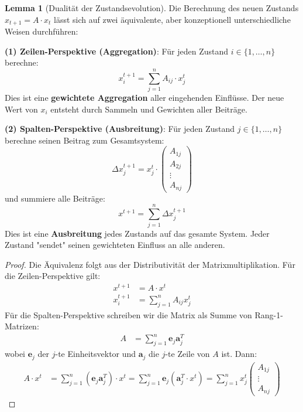﻿\documentclass[a4paper,12pt]{report}
\theoremstyle{definition}
\newtheorem{lemma}{Lemma}
\begin{document}
	\begin{lemma}[Dualität der Zustandsevolution]
		Die Berechnung des neuen Zustands $x_{t+1} = A \cdot x_t$ lässt sich auf zwei äquivalente, aber konzeptionell unterschiedliche Weisen durchführen:
		
		\textbf{(1) Zeilen-Perspektive (Aggregation)}:
		Für jeden Zustand $i \in \{1,\ldots,n\}$ berechne:
		\[
		x_i^{t+1} = \sum_{j=1}^{n} A_{ij} \cdot x_j^t
		\]
		Dies ist eine \textbf{gewichtete Aggregation} aller eingehenden Einflüsse. Der neue Wert von $x_i$ entsteht durch Sammeln und Gewichten aller Beiträge.
		
		\textbf{(2) Spalten-Perspektive (Ausbreitung)}:
		Für jeden Zustand $j \in \{1,\ldots,n\}$ berechne seinen Beitrag zum Gesamtsystem:
		\[
		\Delta x^{t+1}_j = x_j^t \cdot \begin{pmatrix} A_{1j} \\ A_{2j} \\ \vdots \\ A_{nj} \end{pmatrix}
		\]
		und summiere alle Beiträge:
		\[
		x^{t+1} = \sum_{j=1}^{n} \Delta x^{t+1}_j
		\]
		Dies ist eine \textbf{Ausbreitung} jedes Zustands auf das gesamte System. Jeder Zustand "sendet" seinen gewichteten Einfluss an alle anderen.
	\end{lemma}
	
	\begin{proof}
		Die Äquivalenz folgt aus der Distributivität der Matrixmultiplikation. Für die Zeilen-Perspektive gilt:
		\begin{align}
			x^{t+1} &= A \cdot x^t \\
			x_i^{t+1} &= \sum_{j=1}^n A_{ij} x_j^t
		\end{align}
		Für die Spalten-Perspektive schreiben wir die Matrix als Summe von Rang-1-Matrizen:
		\begin{align}
			A &= \sum_{j=1}^n \mathbf{e}_j \mathbf{a}_j^T
		\end{align}
		wobei $\mathbf{e}_j$ der $j$-te Einheitsvektor und $\mathbf{a}_j$ die $j$-te Zeile von $A$ ist. Dann:
		\begin{align}
			A \cdot x^t &= \sum_{j=1}^n (\mathbf{e}_j \mathbf{a}_j^T) \cdot x^t = \sum_{j=1}^n \mathbf{e}_j (\mathbf{a}_j^T \cdot x^t) = \sum_{j=1}^n x_j^t \begin{pmatrix} A_{1j} \\ \vdots \\ A_{nj} \end{pmatrix}
		\end{align}
	\end{proof}
	
\end{document}
